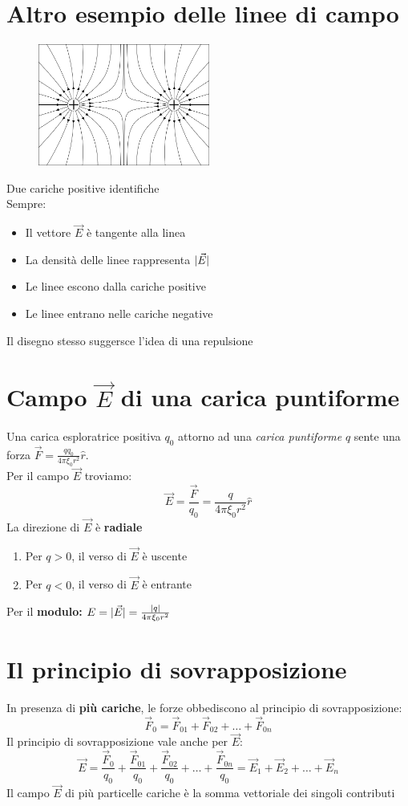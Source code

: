 \section {Altro esempio delle linee di campo}
\begin{figure}[!h]
 	\centering
	\includegraphics[height=4cm]{img/linee elettriche repulsione.png}
\end{figure}
Due cariche positive identifiche\\
Sempre:
\begin{itemize}
\item Il vettore $\vec{E}$ è tangente alla linea
\item La densità delle linee rappresenta $\lvert\vec{E}\rvert$
\item Le linee escono dalla cariche positive
\item Le linee entrano nelle cariche negative
\end{itemize}
Il disegno stesso suggersce l'idea di una repulsione
\section{Campo $\vec{E}$ di una carica puntiforme}
Una carica esploratrice positiva $q_0$ attorno ad una \textit{carica puntiforme} $q$ sente una forza $\vec{F}=\frac{qq_0}{4\pi \xi_0r^2}\hat{r}$. \\
Per il campo $\vec{E}$ troviamo:
\begin{equation}
	\vec{E}=\frac{\vec{F}}{q_0}=\frac{q}{4\pi \xi_0r^2}\hat{r}
\end{equation}
La direzione di $\vec{E}$ è \textbf{radiale}
\begin{enumerate}
\item Per $q>0$, il verso di $\vec{E}$ è uscente
\item Per $q<0$, il verso di $\vec{E}$ è entrante
\end{enumerate}
Per il \textbf{modulo:} $E=\lvert\vec{E}\rvert=\frac{\lvert q\rvert}{4\pi \xi_0r^2}$  
\section{Il principio di sovrapposizione}
In presenza di \textbf{più cariche}, le forze obbediscono al principio di sovrapposizione:
\begin{equation}
  \vec{F}_0=\vec{F}_{01}+\vec{F}_{02}+\dots+\vec{F}_{0n}
\end{equation}
Il principio di sovrapposizione vale anche per $\vec{E}$:
\begin{equation}
  \vec{E}=\frac{\vec{F}_0}{q_0}+\frac{\vec{F}_{01}}{q_0}+\frac{\vec{F}_{02}}{q_0}+\dots+\frac{\vec{F}_{0n}}{q_0}=\vec{E}_1+\vec{E}_2+\dots+\vec{E}_n
\end{equation}
Il campo $\vec{E}$ di più particelle cariche è la somma vettoriale dei singoli contributi
